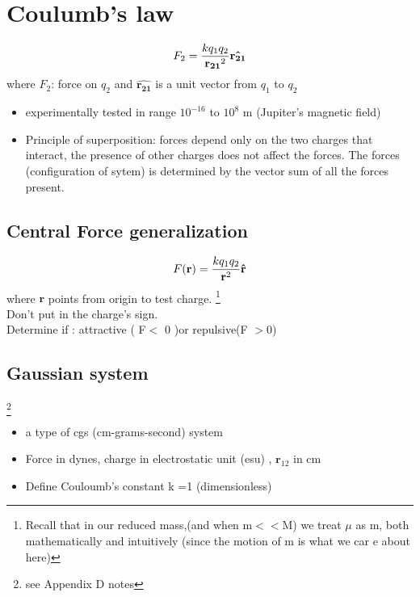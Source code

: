 \documentclass[12 pt , twoside, letterpaper] {article}
\renewcommand{\vec}[1]{\mathbf{#1}}
\let\oldhat\hat
\renewcommand{\hat}[1]{\oldhat{\mathbf{#1}}}
\begin{document}
\section {Coulumb's law}
\begin{align}F_2= \frac{kq_1q_2}{\vec {r_{21}}^2}\bf \hat{r_{21}}\end{align}
where $F_2$: force on $ q_2$ 
and $\hat{r_{21}}$ is a unit vector from $q_1$ to $q_2$
\begin{itemize}
\item experimentally tested in range $10^{-16}$ to $10^8$ m (Jupiter's magnetic field)
\item Principle of superposition: forces depend only on the two charges that interact, the presence of other charges does not affect the forces. The forces (configuration of sytem) is determined by the vector sum of all the forces present.

\end{itemize}
\subsection{ Central Force generalization}
 $$F(\vec r)=\frac{kq_1q_2}{\vec {r} ^2} \bf \hat{r}$$
 where $\vec {r}$ points from origin to test charge. \footnote{Recall that in our reduced mass,(and when m$<<$M) we treat $\mu$ as m, both mathematically and intuitively (since the motion of m is what we car
 e about here) }
\\Don't put in the charge's sign.
\\Determine if : 
 attractive ( F$<$ 0 )or repulsive(F $>$0)
 \subsection{Gaussian system}
 \footnote{see Appendix D notes}

 \begin{itemize}
 \item a type of cgs (cm-grams-second) system
 \item Force in dynes, charge in electrostatic unit (esu) , $\vec r_{12}$ in cm
 \item Define Couloumb's constant k =1 (dimensionless)
 \end{itemize}
\end{document}
